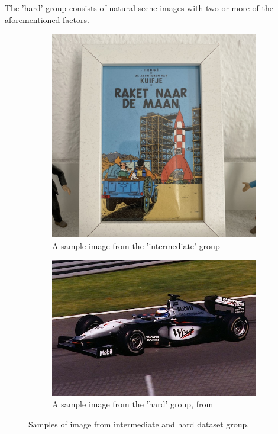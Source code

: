 \documentclass[10pt, a4paper]{article}
\begin{document}
The 'hard' group consists of natural scene images with two or more of the aforementioned factors.
\begin{figure}[h!]
	\centering
	\begin{subfigure}[b]{0.4\linewidth}
		\includegraphics[width=\linewidth]{img/sample1.jpeg}
		\caption{A sample image from the 'intermediate' group}
	\end{subfigure}
	\begin{subfigure}[b]{0.4\linewidth}
		\includegraphics[width=\linewidth]{img/samplehard.JPG}
		\caption{A sample image from the 'hard' group, from \cite{mikapic}}
	\end{subfigure}
	\caption{Samples of image from intermediate and hard dataset group.}
	\label{fig:samples_dataset}
  \end{figure}
\end{document}
